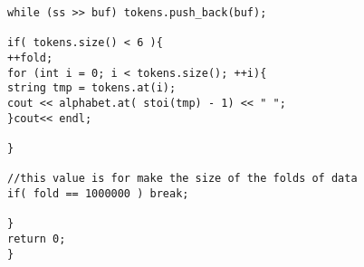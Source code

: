 \begin{figure}[tb]
\begin{lstlisting}[frame=single,basicstyle=\ttfamily\tiny,]
while (ss >> buf) tokens.push_back(buf);

if( tokens.size() < 6 ){
++fold;
for (int i = 0; i < tokens.size(); ++i){
string tmp = tokens.at(i); 
cout << alphabet.at( stoi(tmp) - 1) << " ";
}cout<< endl;

}

//this value is for make the size of the folds of data
if( fold == 1000000 ) break;

}
return 0;
}
\end{lstlisting}



	
	
	
\end{figure}







